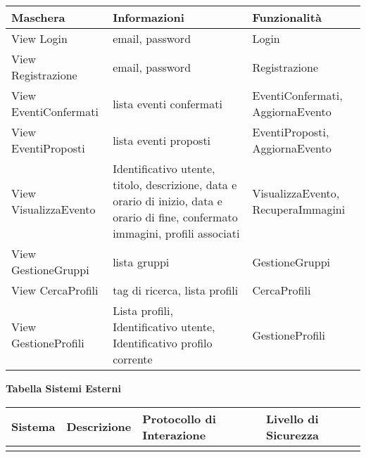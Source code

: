 \begin{tabular} {|P{5cm}|P{7cm}|P{4cm}|}
    \hline
    \textbf{Maschera}     & \textbf{Informazioni}                                                                                                              & \textbf{Funzionalità}              \\
    \hline
    View Login            & email, password                                                                                                                    & Login                              \\
    \hline
    View Registrazione    & email, password                                                                                                                    & Registrazione                      \\
    \hline
    View EventiConfermati & lista eventi confermati                                                                                                            & EventiConfermati, AggiornaEvento   \\
    \hline
    View EventiProposti   & lista eventi proposti                                                                                                              & EventiProposti, AggiornaEvento     \\
    \hline
    View VisualizzaEvento & Identificativo utente, titolo, descrizione, data e orario di inizio, data e orario di fine, confermato immagini, profili associati & VisualizzaEvento, RecuperaImmagini \\
    \hline
    View GestioneGruppi   & lista gruppi                                                                                                                       & GestioneGruppi                     \\
    \hline
    View CercaProfili     & tag di ricerca, lista profili                                                                                                      & CercaProfili                       \\
    \hline
    View GestioneProfili  & Lista profili, Identificativo utente, Identificativo profilo corrente                                                              & GestioneProfili                    \\
    \hline
\end{tabular}
\hfill \break

\textbf{Tabella Sistemi Esterni}
\hfill \break

\begin{tabular} {|P{2.5cm}|P{4cm}|P{4.5cm}|P{4.5cm}|}
    \hline
    \textbf{Sistema} & \textbf{Descrizione} & \textbf{Protocollo di Interazione} & \textbf{Livello di Sicurezza} \\
    \hline
                     &                      &                                    &                               \\
    \hline
\end{tabular}
\hfill \break

